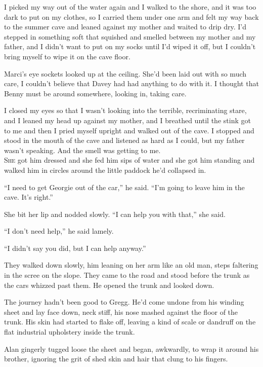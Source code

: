I picked my way out of the water again and I walked to the shore, and
it was too dark to put on my clothes, so I carried them under one arm
and felt my way back to the summer cave and leaned against my mother
and waited to drip dry.  I'd stepped in something soft that squished
and smelled between my mother and my father, and I didn't want to put
on my socks until I'd wiped it off, but I couldn't bring myself to
wipe it on the cave floor.

Marci's eye sockets looked up at the ceiling.  She'd been laid out
with so much care, I couldn't believe that Davey had had anything to
do with it.  I thought that Benny must be around somewhere, looking
in, taking care.

I closed my eyes so that I wasn't looking into the terrible,
recriminating stare, and I leaned my head up against my mother, and I
breathed until the stink got to me and then I pried myself upright and
walked out of the cave.  I stopped and stood in the mouth of the cave
and listened as hard as I could, but my father wasn't speaking.  And
the smell was getting to me.
\\
\lettrine[lines=3, lhang=.5, nindent=0pt, findent=2pt]{S}{he} got him dressed and she fed him sips of water and she got him
standing and walked him in circles around the little paddock he'd
collapsed in.

``I need to get Georgie out of the car,'' he said.  ``I'm going to
leave him in the cave.  It's right.''

She bit her lip and nodded slowly.  ``I can help you with that,'' she
said.

``I don't need help,'' he said lamely.

``I didn't say you did, but I can help anyway.''

They walked down slowly, him leaning on her arm like an old man, steps
faltering in the scree on the slope.  They came to the road and stood
before the trunk as the cars whizzed past them.  He opened the trunk
and looked down.

The journey hadn't been good to Gregg.  He'd come undone from his
winding sheet and lay face down, neck stiff, his nose mashed against
the floor of the trunk.  His skin had started to flake off, leaving a
kind of scale or dandruff on the flat industrial upholstery inside the
trunk.

Alan gingerly tugged loose the sheet and began, awkwardly, to wrap it
around his brother, ignoring the grit of shed skin and hair that clung
to his fingers.

